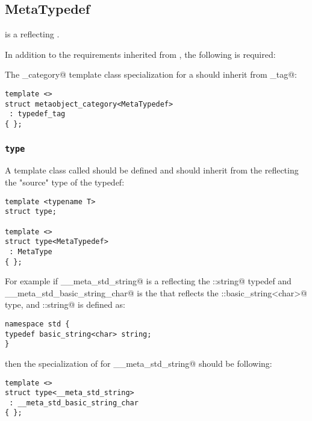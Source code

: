 \subsection{MetaTypedef}
\label{concept-MetaTypedef}

 is a  reflecting \verb@typedef@s.

In addition to the requirements inherited from , the following is required:

The \verb@metaobject_category@ template class specialization for a  should
inherit from \verb@typedef_tag@:

\begin{verbatim}
template <>
struct metaobject_category<MetaTypedef>
 : typedef_tag
{ };
\end{verbatim}

\subsubsection{\texttt{type}}

A template class called \verb@type@ should be defined and should inherit from the 
reflecting the "source" type of the typedef:

\begin{verbatim}
template <typename T>
struct type;

template <>
struct type<MetaTypedef>
 : MetaType
{ };
\end{verbatim}

For example if \verb@__meta_std_string@ is a  reflecting the \verb@std::string@
typedef and \verb@__meta_std_basic_string_char@ is the  that reflects
the \verb@std::basic_string<char>@ type, and \verb@std::string@ is defined as:

\begin{verbatim}
namespace std {
typedef basic_string<char> string;
}
\end{verbatim}

then the specialization of \verb@type@ for \verb@__meta_std_string@ should be following:

\begin{verbatim}
template <>
struct type<__meta_std_string>
 : __meta_std_basic_string_char
{ };
\end{verbatim}

